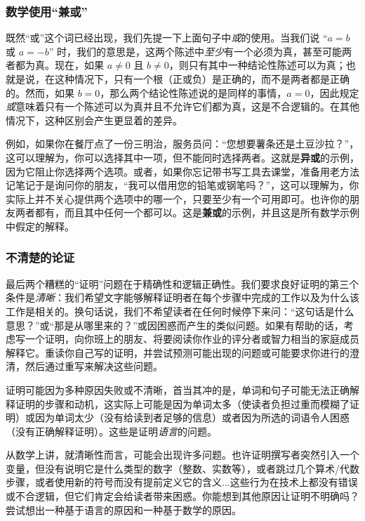 \subsubsection*{数学使用``兼或''}

既然``或''这个词已经出现，我们先提一下上面句子中\emph{或}的使用。当我们说 ``$a = b$ 或 $a = -b$'' 时，我们的意思是，这两个陈述中\emph{至少}有一个必须为真，甚至可能两者都为真。现在，如果 $a \ne 0$ 且 $b \ne 0$，则只有其中一种结论性陈述可以为真；也就是说，在这种情况下，只有一个根（正或负）是正确的，而不是两者都是正确的。然而，如果 $b = 0$，那么两个结论性陈述说的是同样的事情，$a = 0$，因此规定\emph{或}意味着只有一个陈述可以为真并且不允许它们都为真，这是不合逻辑的。在其他情况下，这种区别会产生更显着的差异。

例如，如果你在餐厅点了一份三明治，服务员问：``您想要薯条还是土豆沙拉？''，这可以理解为，你可以选择其中一项，但不能同时选择两者。这就是\textbf{异或}的示例，因为它阻止你选择两个选项。或者，如果你忘记带书写工具去课堂，准备用老方法记笔记于是询问你的朋友，``我可以借用您的铅笔或钢笔吗？''，这可以理解为，你实际上并不关心提供两个选项中的哪一个，只要至少有一个可用即可。也许你的朋友两者都有，而且其中任何一个都可以。这是\textbf{兼或}的示例，并且这是所有数学示例中假定的解释。

\subsubsection*{不清楚的论证}

最后两个糟糕的``证明''问题在于精确性和逻辑正确性。我们要求良好证明的第三个条件是\emph{清晰}：我们希望文字能够解释证明者在每个步骤中完成的工作以及为什么该工作是相关的。换句话说，我们不希望读者在任何时候停下来问：``这句话是什么意思？''或``那是从哪里来的？''或因困惑而产生的类似问题。如果有帮助的话，考虑写一个证明，向你班上的朋友、将要阅读你作业的评分者或智力相当的家庭成员解释它。重读你自己写的证明，并尝试预测可能出现的问题或可能要求你进行的澄清，然后通过重写来解决这些问题。

证明可能因为多种原因失败或不清晰，首当其冲的是，单词和句子可能无法正确解释证明的步骤和动机，这实际上可能是因为单词太多（使读者负担过重而模糊了证明）或因为单词太少（没有给读到者足够的信息）或者因为所选的词语令人困惑（没有正确解释证明）。这些是证明\emph{语言}的问题。

从数学上讲，就清晰性而言，可能会出现许多问题。也许证明撰写者突然引入一个变量，但没有说明它是什么类型的数字（整数、实数等），或者跳过几个算术/代数步骤，或者使用新的符号而没有提前定义它的含义...这些行为在技术上都没有错误或不合逻辑，但它们肯定会给读者带来困惑。你能想到其他原因让证明不明确吗？尝试想出一种基于语言的原因和一种基于数学的原因。

